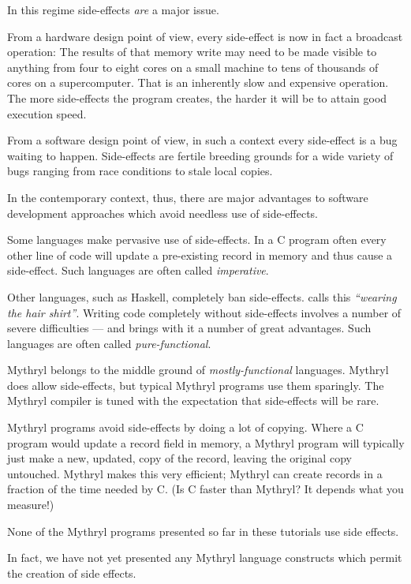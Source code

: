 In this regime side-effects {\it are} a major issue.

From a hardware design point of view, every side-effect is now in fact 
a broadcast operation: The results of that memory write may need to be 
made visible to anything from four to eight cores on a small machine 
to tens of thousands of cores on a supercomputer.  That is an 
inherently slow and expensive operation.  The more side-effects the 
program creates, the harder it will be to attain good execution speed.

From a software design point of view, in such a context every 
side-effect is a bug waiting to happen.  Side-effects are fertile 
breeding grounds for a wide variety of bugs ranging from race 
conditions to stale local copies.

In the contemporary context, thus, there are major advantages to 
software development approaches which avoid needless use of 
side-effects.


Some languages make pervasive use of side-effects.  In a C program 
often every other line of code will update a pre-existing 
record in memory and thus cause a side-effect.  Such languages are 
often called {\it imperative}.

Other languages, such as Haskell, completely ban side-effects. 
 calls this {\it ``wearing the hair shirt''}.  Writing 
code completely without side-effects involves a number of severe 
difficulties --- and brings with it a number of great advantages. 
Such languages are often called {\it pure-functional}.

Mythryl belongs to the middle ground of {\it mostly-functional} 
languages.  Mythryl does allow side-effects, but typical Mythryl 
programs use them sparingly. The Mythryl compiler is 
tuned with the expectation that side-effects will be rare. 

Mythryl programs avoid side-effects by doing a lot of copying. 
Where a C program would update a record field in memory, a 
Mythryl program will typically just make a new, updated, copy of the 
record, leaving the original copy untouched.  Mythryl 
makes this very efficient;  Mythryl can create records 
in a fraction of the time needed by C.  (Is C faster than Mythryl? 
It depends what you measure!)

None of the Mythryl programs presented so far in these tutorials 
use side effects.

In fact, we have not yet presented any 
Mythryl language constructs which permit the creation of side 
effects.

